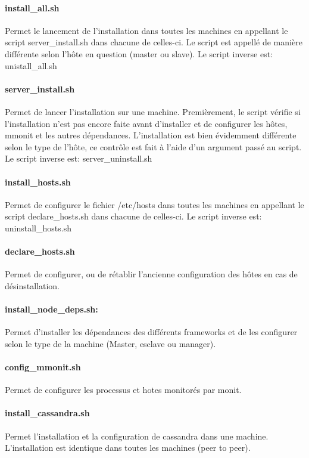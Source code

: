 \documentclass[a4paper, 11pt, titlepage]{article}
\begin{document}
\paragraph{install\_all.sh}
Permet le lancement de l'installation dans toutes les machines en appellant le script server\_install.sh dans chacune de celles-ci. Le script est appellé de manière différente selon l'hôte en question (master ou slave). Le script inverse est: unistall\_all.sh


\paragraph{server\_install.sh}
Permet de lancer l'installation sur une machine.
Premièrement, le script vérifie si l'installation n'est pas encore faite avant d'installer et de configurer les hôtes, mmonit et les autres dépendances. L'installation est bien évidemment différente selon le type de l'hôte, ce contrôle est fait à l'aide d'un argument passé au script. Le script inverse est: server\_uninstall.sh

\paragraph{install\_hosts.sh}
Permet de configurer le fichier /etc/hosts dans toutes les machines en appellant le script declare\_hosts.sh dans chacune de celles-ci. Le script inverse est: uninstall\_hosts.sh


\paragraph{declare\_hosts.sh}
Permet de configurer, ou de rétablir l'ancienne configuration des hôtes en cas de désinstallation.

\paragraph{install\_node\_deps.sh:}
Permet d'installer les dépendances des différents frameworks et de les configurer selon le type de la machine (Master, esclave ou manager).

\paragraph{config\_mmonit.sh}
Permet de configurer les processus et hotes monitorés par monit.

\paragraph{install\_cassandra.sh}
Permet l'installation et la configuration de cassandra dans une machine. L’installation est identique dans toutes les machines (peer to peer).
\end{document}

